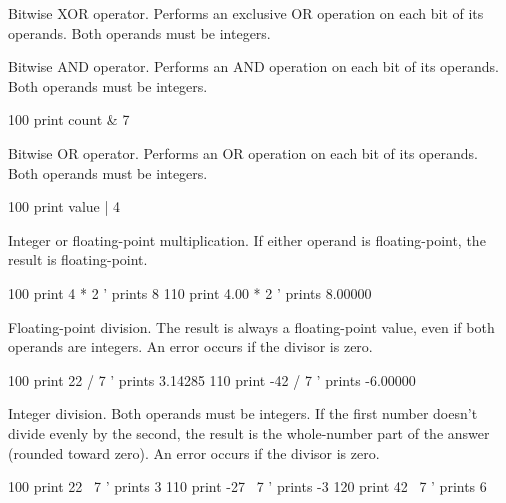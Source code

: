 \begin{entry}
Bitwise XOR operator. Performs an exclusive OR operation on each bit of its operands. Both operands must be integers.

\end{entry}

\begin{entry}
Bitwise AND operator. Performs an AND operation on each bit of its operands. Both operands must be integers.

\begin{lstexample}
100 print count & 7
\end{lstexample}
\end{entry}

\begin{entry}
Bitwise OR operator. Performs an OR operation on each bit of its operands. Both operands must be integers.

\begin{lstexample}
100 print value | 4
\end{lstexample}
\end{entry}

\begin{entry}
Integer or floating-point multiplication. If either operand is floating-point, the result is floating-point.

\begin{lstexample}
100 print 4 * 2     ' prints 8
110 print 4.00 * 2  ' prints 8.00000
\end{lstexample}
\end{entry}

\begin{entry}
Floating-point division. The result is always a floating-point value, even if both operands are integers. An error occurs if the divisor is zero.

\begin{lstexample}
100 print 22 / 7   ' prints 3.14285
110 print -42 / 7  ' prints -6.00000
\end{lstexample}
\end{entry}

\begin{entry}
Integer division. Both operands must be integers. If the first number doesn’t divide evenly by the second, the result is the whole-number part of the answer (rounded toward zero). An error occurs if the divisor is zero.

\begin{lstexample}
100 print 22 \ 7   ' prints 3
110 print -27 \ 7  ' prints -3
120 print 42 \ 7   ' prints 6
\end{lstexample}
\end{entry}

